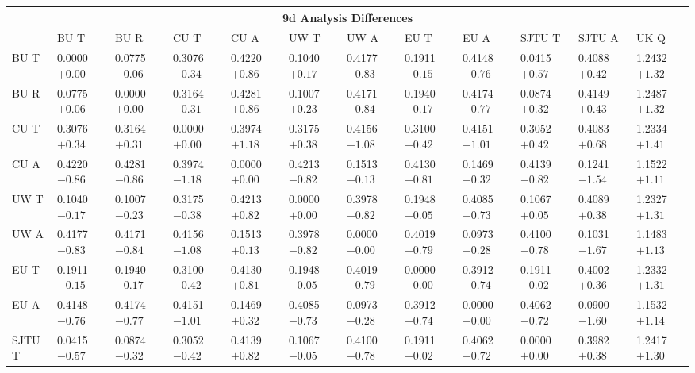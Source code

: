\begin{landscape}
\begin{table}
\small
\centering
\renewcommand{\arraystretch}{1.5}
\begin{tabularx}{1\linewidth}{@{\extracolsep{\fill}}lXXXXXXXXXXX}
  \toprule
  	\multicolumn{12}{c}{{\normalsize 9d Analysis Differences}} \\
  \midrule
  	       & BU T & BU R & CU T & CU A & UW T & UW A & EU T & EU A & SJTU T & SJTU A & UK Q \\
  \midrule
	BU T   & 0.0000 $+0.00$ & 0.0775 $-0.06$ & 0.3076 $-0.34$ & 0.4220 $+0.86$ & 0.1040 $+0.17$ & 0.4177 $+0.83$ & 0.1911 $+0.15$ & 0.4148 $+0.76$ & 0.0415 $+0.57$ & 0.4088 $+0.42$ & 1.2432 $+1.32$  \\
	BU R   & 0.0775 $+0.06$ & 0.0000 $+0.00$ & 0.3164 $-0.31$ & 0.4281 $+0.86$ & 0.1007 $+0.23$ & 0.4171 $+0.84$ & 0.1940 $+0.17$ & 0.4174 $+0.77$ & 0.0874 $+0.32$ & 0.4149 $+0.43$ & 1.2487 $+1.32$  \\
	CU T   & 0.3076 $+0.34$ & 0.3164 $+0.31$ & 0.0000 $+0.00$ & 0.3974 $+1.18$ & 0.3175 $+0.38$ & 0.4156 $+1.08$ & 0.3100 $+0.42$ & 0.4151 $+1.01$ & 0.3052 $+0.42$ & 0.4083 $+0.68$ & 1.2334 $+1.41$  \\
	CU A   & 0.4220 $-0.86$ & 0.4281 $-0.86$ & 0.3974 $-1.18$ & 0.0000 $+0.00$ & 0.4213 $-0.82$ & 0.1513 $-0.13$ & 0.4130 $-0.81$ & 0.1469 $-0.32$ & 0.4139 $-0.82$ & 0.1241 $-1.54$ & 1.1522 $+1.11$  \\
	UW T   & 0.1040 $-0.17$ & 0.1007 $-0.23$ & 0.3175 $-0.38$ & 0.4213 $+0.82$ & 0.0000 $+0.00$ & 0.3978 $+0.82$ & 0.1948 $+0.05$ & 0.4085 $+0.73$ & 0.1067 $+0.05$ & 0.4089 $+0.38$ & 1.2327 $+1.31$  \\
	UW A   & 0.4177 $-0.83$ & 0.4171 $-0.84$ & 0.4156 $-1.08$ & 0.1513 $+0.13$ & 0.3978 $-0.82$ & 0.0000 $+0.00$ & 0.4019 $-0.79$ & 0.0973 $-0.28$ & 0.4100 $-0.78$ & 0.1031 $-1.67$ & 1.1483 $+1.13$  \\
	EU T   & 0.1911 $-0.15$ & 0.1940 $-0.17$ & 0.3100 $-0.42$ & 0.4130 $+0.81$ & 0.1948 $-0.05$ & 0.4019 $+0.79$ & 0.0000 $+0.00$ & 0.3912 $+0.74$ & 0.1911 $-0.02$ & 0.4002 $+0.36$ & 1.2332 $+1.31$  \\
	EU A   & 0.4148 $-0.76$ & 0.4174 $-0.77$ & 0.4151 $-1.01$ & 0.1469 $+0.32$ & 0.4085 $-0.73$ & 0.0973 $+0.28$ & 0.3912 $-0.74$ & 0.0000 $+0.00$ & 0.4062 $-0.72$ & 0.0900 $-1.60$ & 1.1532 $+1.14$  \\
	SJTU T & 0.0415 $-0.57$ & 0.0874 $-0.32$ & 0.3052 $-0.42$ & 0.4139 $+0.82$ & 0.1067 $-0.05$ & 0.4100 $+0.78$ & 0.1911 $+0.02$ & 0.4062 $+0.72$ & 0.0000 $+0.00$ & 0.3982 $+0.38$ & 1.2417 $+1.30$  \\

\end{tabularx}
\end{table}
\end{landscape}
